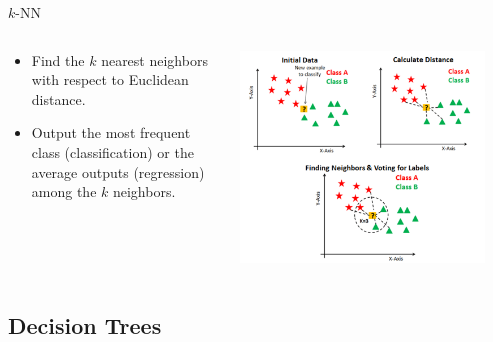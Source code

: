   \begin{frame}{$k$-NN}
    \begin{columns}
      \begin{column}{0.4\textwidth}  
      \begin{itemize}
          \item Find the $k$ nearest neighbors with respect to Euclidean distance.
          \item Output the most frequent class (classification) or the average outputs (regression) among the $k$ neighbors.
      \end{itemize}
      \end{column}
      \begin{column}{0.6\textwidth}
        \includegraphics[width=0.9\textwidth]{images/knn.png}
      \end{column}
    \end{columns}
  \end{frame}

\subsection{Decision Trees}

